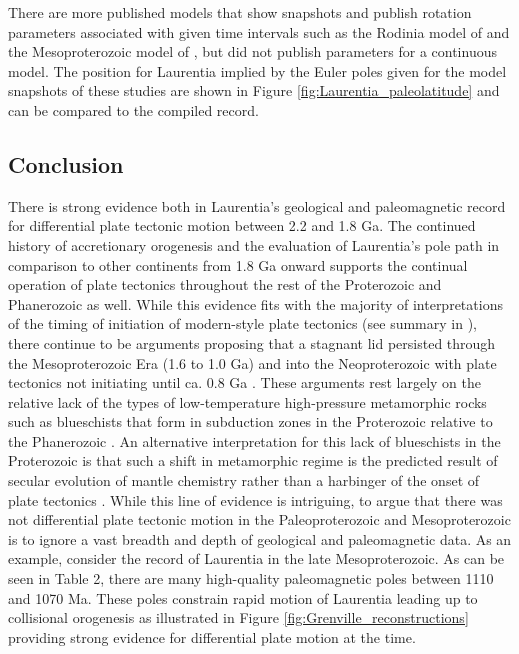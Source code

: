 \documentclass[11pt,letterpaper]{article}
\begin{document}
There are more published models that show snapshots and publish rotation parameters associated with given time intervals such as the Rodinia model of \cite{Li2008a} and the Mesoproterozoic model of \cite{Pisarevsky2014b}, but did not publish parameters for a continuous model. The position for Laurentia implied by the Euler poles given for the model snapshots of these studies are shown in Figure \ref{fig:Laurentia_paleolatitude} and can be compared to the compiled record. 

\subsection{Conclusion}

There is strong evidence both in Laurentia's geological and paleomagnetic record for differential plate tectonic motion between 2.2 and 1.8 Ga. The continued history of accretionary orogenesis and the evaluation of Laurentia's pole path in comparison to other continents from 1.8 Ga onward supports the continual operation of plate tectonics throughout the rest of the Proterozoic and Phanerozoic as well. While this evidence fits with the majority of interpretations of the timing of initiation of modern-style plate tectonics (see summary in \citealp{Korenaga2013a}), there continue to be arguments proposing that a stagnant lid persisted through the Mesoproterozoic Era (1.6 to 1.0 Ga) and into the Neoproterozoic  with plate tectonics not initiating until ca. 0.8 Ga \citep{Hamilton2011a, Stern2018a}. These arguments rest largely on the relative lack of the types of low-temperature high-pressure metamorphic rocks such as blueschists that form in subduction zones in the Proterozoic relative to the Phanerozoic \citep{Stern2013a}. An alternative interpretation for this lack of blueschists in the Proterozoic is that such a shift in metamorphic regime is the predicted result of secular evolution of mantle chemistry rather than a harbinger of the onset of plate tectonics \citep{Palin2015a}. While this line of evidence is intriguing, to argue that there was not differential plate tectonic motion in the Paleoproterozoic and Mesoproterozoic is to ignore a vast breadth and depth of geological and paleomagnetic data. As an example, consider the record of Laurentia in the late Mesoproterozoic. As can be seen in Table 2, there are many high-quality paleomagnetic poles between 1110 and 1070 Ma. These poles constrain rapid motion of Laurentia leading up to collisional orogenesis as illustrated in Figure \ref{fig:Grenville_reconstructions} providing strong evidence for differential plate motion at the time.
\end{document}
